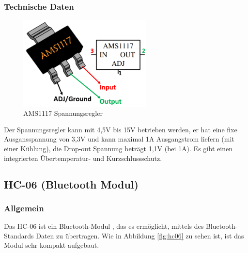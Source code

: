 \subsubsection{Technische Daten}
\begin{figure}[H]
    \centering
    \includegraphics[width=0.6\textwidth]{img/Hardware/AMS1117.png}
    \caption{AMS1117 Spannungsregler}
    \label{fig:ams1117}
\end{figure}
Der Spannungsregler kann mit 4,5V bis 15V betrieben werden,
er hat eine fixe Ausgansspannung von 3,3V und kann maximal 1A Ausgangstrom liefern (mit einer Kühlung),
die Drop-out Spannung beträgt 1,1V (bei 1A).
%
Es gibt einen integrierten Übertemperatur- und Kurzschlussschutz.
%
\subsection{HC-06 (Bluetooth Modul)}
%
\subsubsection{Allgemein}
Das HC-06 ist ein Bluetooth-Modul \cite{hc06-datasheet},
das es ermöglicht,
mittels des Bluetooth-Standards Daten zu übertragen.
%
Wie in Abbildung \ref{fig:hc06} zu sehen ist,
ist das Modul sehr kompakt aufgebaut.
